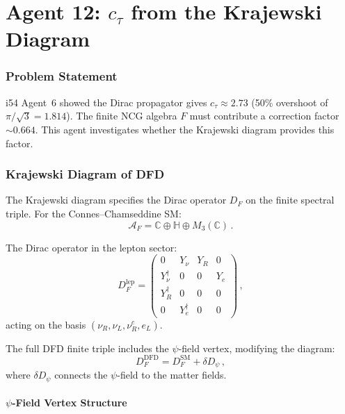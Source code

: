 \documentclass[11pt,a4paper]{article}
\begin{document}
\part{Agent 12: $c_\tau$ from the Krajewski Diagram}
\label{part:ctau-krajewski}

\section{Problem Statement}

i54 Agent~6 showed the Dirac propagator gives $c_\tau \approx 2.73$ (50\% overshoot of $\pi/\sqrt{3} = 1.814$). The finite NCG algebra $F$ must contribute a correction factor $\sim 0.664$. This agent investigates whether the Krajewski diagram provides this factor.

\section{Krajewski Diagram of DFD}

The Krajewski diagram specifies the Dirac operator $D_F$ on the finite spectral triple. For the Connes--Chamseddine SM:
\begin{equation}
\mathcal{A}_F = \mathbb{C} \oplus \mathbb{H} \oplus M_3(\mathbb{C})\,.
\end{equation}

The Dirac operator in the lepton sector:
\begin{equation}
D_F^{\mathrm{lep}} = \begin{pmatrix} 0 & Y_\nu & Y_R & 0 \\ Y_\nu^\dagger & 0 & 0 & Y_e \\ Y_R^\dagger & 0 & 0 & 0 \\ 0 & Y_e^\dagger & 0 & 0 \end{pmatrix}\,,
\end{equation}
acting on the basis $(\nu_R, \nu_L, \nu_R^c, e_L)$.

The full DFD finite triple includes the $\psi$-field vertex, modifying the diagram:
\begin{equation}
D_F^{\mathrm{DFD}} = D_F^{\mathrm{SM}} + \delta D_\psi\,,
\end{equation}
where $\delta D_\psi$ connects the $\psi$-field to the matter fields.

\subsection{$\psi$-Field Vertex Structure}
\end{document}

